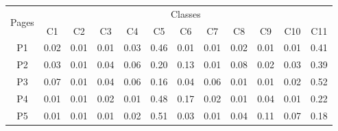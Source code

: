 \begin{table}[h]
\footnotesize
\begin{tabular}{|c||l|l|l|l|l|l|l|l|l|l|l|}
\hline
\multirow{2}{*}{Pages} & \multicolumn{11}{c|}{Classes}                                                                                                                                                                                                                                                                 \\ \cline{2-12} 
                            & \multicolumn{1}{c|}{C1} & \multicolumn{1}{c|}{C2} & \multicolumn{1}{c|}{C3} & \multicolumn{1}{c|}{C4} & \multicolumn{1}{c|}{C5} & \multicolumn{1}{c|}{C6} & \multicolumn{1}{c|}{C7} & \multicolumn{1}{c|}{C8} & \multicolumn{1}{c|}{C9} & \multicolumn{1}{c|}{C10} & \multicolumn{1}{c|}{C11} \\ \hline \hline
P1                          & 0.02                    & 0.01                    & 0.01                    & 0.03                    & 0.46                    & 0.01                    & 0.01                    & 0.02                    & 0.01                    & 0.01                     & 0.41                     \\ \hline
P2                          & 0.03                    & 0.01                    & 0.04                    & 0.06                    & 0.20                    & 0.13                    & 0.01                    & 0.08                    & 0.02                    & 0.03                     & 0.39                     \\ \hline
P3                          & 0.07                    & 0.01                    & 0.04                    & 0.06                    & 0.16                    & 0.04                    & 0.06                    & 0.01                    & 0.01                    & 0.02                     & 0.52                     \\ \hline
P4                          & 0.01                    & 0.01                    & 0.02                    & 0.01                    & 0.48                    & 0.17                    & 0.02                    & 0.01                    & 0.04                    & 0.01                     & 0.22                     \\ \hline
P5                          & 0.01                    & 0.01                    & 0.01                    & 0.02                    & 0.51                    & 0.03                    & 0.01                    & 0.04                    & 0.11                    & 0.07                     & 0.18                     \\ \hline \hline

\end{tabular}
\end{table}
